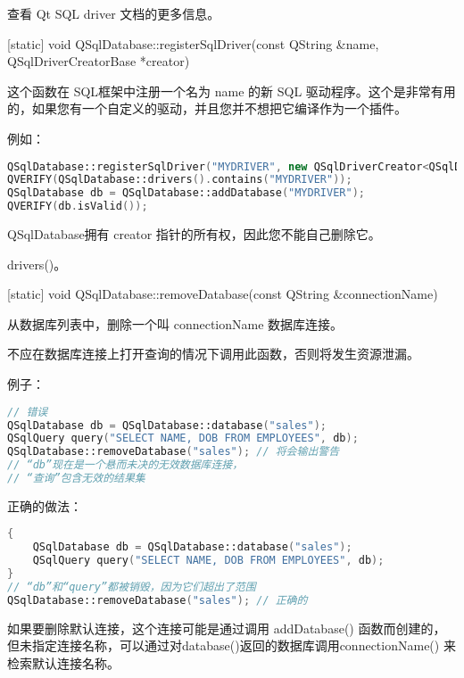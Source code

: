 查看 Qt SQL driver 文档的更多信息。

[static] void QSqlDatabase::registerSqlDriver(const QString \&name, QSqlDriverCreatorBase *creator)


这个函数在 SQL框架中注册一个名为 name 的新 SQL 驱动程序。这个是非常有用的，如果您有一个自定义的驱动，并且您并不想把它编译作为一个插件。

例如：


\begin{lstlisting}[language=C++]
QSqlDatabase::registerSqlDriver("MYDRIVER", new QSqlDriverCreator<QSqlDriver>);
QVERIFY(QSqlDatabase::drivers().contains("MYDRIVER"));
QSqlDatabase db = QSqlDatabase::addDatabase("MYDRIVER");
QVERIFY(db.isValid());
\end{lstlisting}

QSqlDatabase拥有 creator 指针的所有权，因此您不能自己删除它。

\begin{seeAlso}
drivers()。
\end{seeAlso}

[static] void QSqlDatabase::removeDatabase(const QString \&connectionName)


从数据库列表中，删除一个叫 connectionName 数据库连接。

\begin{notice}[警告]
不应在数据库连接上打开查询的情况下调用此函数，否则将发生资源泄漏。
\end{notice}



\clearpage

例子：

\begin{lstlisting}[language=C++]
// 错误
QSqlDatabase db = QSqlDatabase::database("sales");
QSqlQuery query("SELECT NAME, DOB FROM EMPLOYEES", db);
QSqlDatabase::removeDatabase("sales"); // 将会输出警告
// “db”现在是一个悬而未决的无效数据库连接，
// “查询”包含无效的结果集
\end{lstlisting}


正确的做法：

\begin{lstlisting}[language=C++]
{
    QSqlDatabase db = QSqlDatabase::database("sales");
    QSqlQuery query("SELECT NAME, DOB FROM EMPLOYEES", db);
}
// “db”和“query”都被销毁，因为它们超出了范围
QSqlDatabase::removeDatabase("sales"); // 正确的
\end{lstlisting}

如果要删除默认连接，这个连接可能是通过调用 addDatabase() 函数而创建的，但未指定连接名称，可以通过对database()返回的数据库调用connectionName() 来检索默认连接名称。

